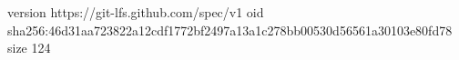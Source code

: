 version https://git-lfs.github.com/spec/v1
oid sha256:46d31aa723822a12cdf1772bf2497a13a1c278bb00530d56561a30103e80fd78
size 124
